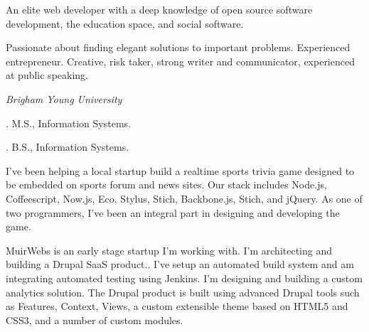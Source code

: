 \documentclass[11pt]{article}
\begin{document}
\medskip

\reversemarginpar

\medskip       

\medskip
{}

\noindent An elite web developer with a deep knowledge of open source software development, the education space, and social software.

\medskip

\noindent Passionate about finding elegant solutions to important problems. Experienced entrepreneur. Creative, risk taker, strong writer and communicator, experienced at public speaking.

\bigskip



\noindent\emph{Brigham Young University \vspace{0.15in}}

. M.S., Information Systems.

. B.S., Information Systems.

\bigskip
 
\medskip


\noindent I've been helping a local startup build a realtime sports trivia game designed to be embedded on sports forum and news sites. Our stack includes Node.js, Coffeescript, Now.js, Eco, Stylus, Stich, Backbone.js, Stich, and jQuery. As one of two programmers, I've been an integral part in designing and developing the game.

\bigskip


\noindent MuirWebs is an early stage startup I'm working with. I'm architecting and building a Drupal SaaS product.. I’ve setup an automated build system and am integrating automated testing using Jenkins. I’m designing and building a custom analytics solution. The Drupal product is built using advanced Drupal tools such as Features, Context, Views, a custom extensible theme based on HTML5 and CSS3, and a number of custom modules.
\end{document}
